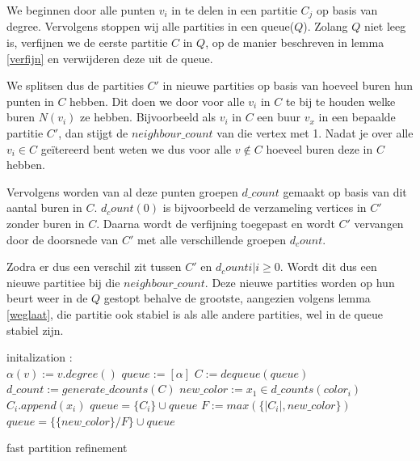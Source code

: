 \documentclass[twoside]{article}
\begin{document}
\begin{multicols}{2}
We beginnen door alle punten $v_i$ in te delen in een partitie $C_j$ op basis van degree. Vervolgens stoppen wij alle partities in een queue($Q$).
Zolang $Q$ niet leeg is, verfijnen we de eerste partitie $C$ in $Q$, op de manier beschreven in lemma \ref{verfijn} en verwijderen deze uit de queue.

We splitsen dus de partities $ C' $  in nieuwe partities op basis van hoeveel buren hun punten in $C$ hebben. Dit doen we door voor alle $v_{i}$ in $C$ te bij te houden welke buren $N(v_{i})$ ze hebben. Bijvoorbeeld als $v_{i}$ in $C$ een buur $v_{x}$ in een bepaalde partitie $C'$, dan stijgt de $neighbour\_count$ van die vertex met 1. Nadat je over alle $v_{i} \in C$ ge\"itereerd bent weten we dus voor alle $v \not \in  C$ hoeveel buren deze in $C$ hebben.

Vervolgens worden van al deze punten groepen $d\_count$ gemaakt op basis van dit aantal buren in $C$. $d_count(0)$ is bijvoorbeeld de verzameling vertices in $C'$ zonder buren in $C$. Daarna wordt de verfijning toegepast en wordt $C'$ vervangen door de doorsnede van $C'$ met alle verschillende groepen $d_count$.

Zodra er dus een verschil zit tussen $C'$ en $d_count{i}|i\geq 0$. Wordt dit dus een nieuwe partitiee bij die $neighbour\_count$. Deze nieuwe partities worden op hun beurt weer in de $Q$ gestopt behalve de grootste, aangezien volgens lemma \ref{weglaat}, die partitie ook stabiel is als alle andere partities, wel in de queue stabiel zijn.

\begin{algorithm}[H]
initalization \;
:\\
{$\alpha(v) := v.degree()$}
$queue := [\alpha]$\;
{$C := dequeue(queue)$\;
$d\_count := generate\_dcounts(C)$\;
{
{$new\_color := x_{1} \in d\_counts(color_{i})$ \;
{$C_{i}.append(x_{i}) $ }
{$ queue = \{C_{i}\} \cup queue $ \;}
{	$ F := max(\{|C_{i}|, new\_color \} ) $ \;
$queue = \{ \{new\_color \} / F \} \cup queue $}}}}
\caption{fast partition refinement}
\EndFunction
\end{algorithm}
\pagebreak


\end{multicols}
\end{document}

